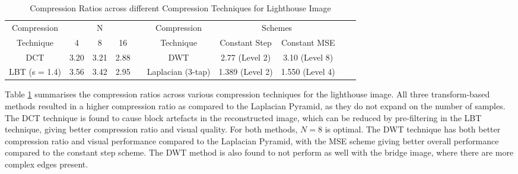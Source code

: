 \begin{table}[h]
\centering
\begin{tabular}{|c|c|c|c|c|c|c|c|c|c|}

\cline{1-4} \cline{6-8}
Compression & \multicolumn{3}{|c|}{N} & & Compression & \multicolumn{2}{|c|}{Schemes}\\
\cline{2-4} \cline{7-8}
Technique & 4 & 8 & 16 & & Technique & Constant Step & Constant MSE\\
\cline{1-4} \cline{6-8}
DCT & 3.20 & 3.21 & 2.88 & & DWT & 2.77 (Level 2) & 3.10 (Level 8)\\
\cline{1-4} \cline{6-8}
LBT (s = 1.4) & 3.56 & 3.42 & 2.95 & & Laplacian (3-tap) & 1.389 (Level 2) & 1.550 (Level 4)\\
\cline{1-4} \cline{6-8}

\end{tabular}
\caption{Compression Ratios across different Compression Techniques for Lighthouse Image}
\label{tab:compression ratios}
\vspace{-2mm}
\end{table}

Table \ref{tab:compression ratios} summarises the compression ratios across various compression techniques for the lighthouse image. All three transform-based methods resulted in a higher compression ratio as compared to the Laplacian Pyramid, as they do not expand on the number of samples. The DCT technique is found to cause block artefacts in the reconstructed image, which can be reduced by pre-filtering in the LBT technique, giving better compression ratio and visual quality. For both methods, $N=8$ is optimal. The DWT technique has both better compression ratio and visual performance compared to the Laplacian Pyramid, with the MSE scheme giving better overall performance compared to the constant step scheme. The DWT method is also found to not perform as well with the bridge image, where there are more complex edges present.
